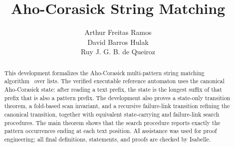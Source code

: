 \documentclass[11pt,a4paper]{article}
\begin{document}
\title{Aho-Corasick String Matching}
\author{Arthur Freitas Ramos\\
David Barros Hulak\\
Ruy J. G. B. de Queiroz}
\maketitle

\begin{abstract}
This development formalizes the Aho-Corasick multi-pattern string matching
algorithm~\cite{AhoCorasick1975} over lists.  The verified executable
reference automaton uses the canonical Aho-Corasick state: after reading a text
prefix, the state is the longest suffix of that prefix that is also a pattern
prefix.  The development also proves a state-only transition theorem, a
fold-based scan invariant, and a recursive failure-link transition refining the
canonical transition, together with equivalent state-carrying and failure-link
search procedures.  The main theorem shows that the search procedure reports
exactly the pattern occurrences ending at each text position.  AI assistance
was used for proof engineering; all final definitions, statements, and proofs
are checked by Isabelle.
\end{abstract}

\tableofcontents





\end{document}
